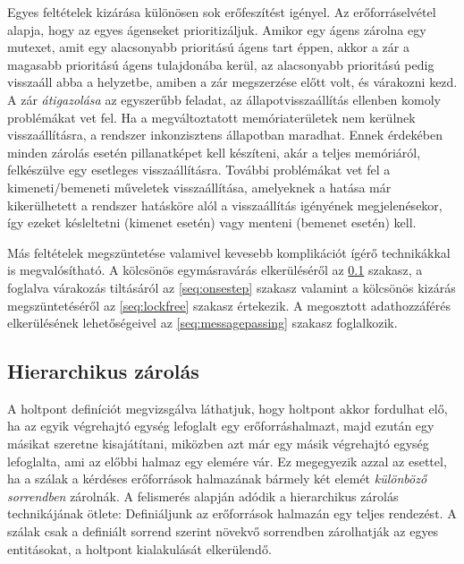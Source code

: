     Egyes feltételek kizárása különösen sok erőfeszítést igényel. Az erőforráselvétel alapja, hogy az egyes ágenseket prioritizáljuk. Amikor egy ágens zárolna egy mutexet, amit egy alacsonyabb prioritású ágens tart éppen, akkor a zár a magasabb prioritású ágens tulajdonába kerül, az alacsonyabb prioritású pedig visszaáll abba a helyzetbe, amiben a zár megszerzése előtt volt, és várakozni kezd. A zár \emph{átigazolása} az egyszerűbb feladat, az állapotvisszaállítás ellenben komoly problémákat vet fel. Ha a megváltoztatott memóriaterületek nem kerülnek visszaállításra, a rendszer inkonzisztens állapotban maradhat. Ennek érdekében minden zárolás esetén pillanatképet kell készíteni, akár a teljes memóriáról, felkészülve egy esetleges visszaállításra. További problémákat vet fel a kimeneti/bemeneti műveletek visszaállítása, amelyeknek a hatása már kikerülhetett a rendszer hatásköre alól a visszaállítás igényének megjelenésekor, így ezeket késleltetni (kimenet esetén) vagy menteni (bemenet esetén) kell.
    
    Más feltételek megszüntetése valamivel kevesebb komplikációt ígérő technikákkal is megvalósítható. A kölcsönös egymásravárás elkerüléséről az \ref{seq:hierarchical} szakasz, a foglalva várakozás tiltásáról az \ref{seq:onsestep} szakasz valamint a kölcsönös kizárás megszüntetéséről az \ref{seq:lockfree} szakasz értekezik. A megosztott adathozzáférés elkerülésének lehetőségeivel az \ref{seq:messagepassing} szakasz foglalkozik.

    \subsection{Hierarchikus zárolás} 
    \label{seq:hierarchical}
    A holtpont definíciót megvizsgálva láthatjuk, hogy holtpont akkor fordulhat elő, ha az egyik végrehajtó egység lefoglalt egy erőforráshalmazt, majd ezután egy másikat szeretne kisajátítani, miközben azt már egy másik végrehajtó egység lefoglalta, ami az előbbi halmaz egy elemére vár. Ez megegyezik azzal az esettel, ha a szálak a kérdéses erőforrások halmazának bármely két elemét \emph{különböző sorrendben} zárolnák. A felismerés alapján adódik a hierarchikus zárolás technikájának ötlete: Definiáljunk az erőforrások halmazán egy teljes rendezést. A szálak csak a definiált sorrend szerint növekvő sorrendben zárolhatják az egyes entitásokat, a holtpont kialakulását elkerülendő. 
    
